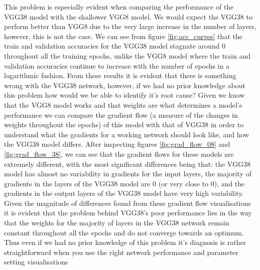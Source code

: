 {{This problem is especially evident when comparing the performance of the VGG38 model with the shallower VGG8 model. We would expect the VGG38 to perform better than VGG8 due to the very large increase in the number of layers, however, this is not the case. We can see from figure \ref{fig:acc_curves} that the train and validation accuracies for the VGG38 model stagnate around 0 throughout all the training epochs, unlike the VGG8 model where the train and validation accuracies continue to increase with the number of epochs in a logarithmic fashion. From these results it is evident that there is something wrong with the VGG38 network, however, if we had no prior knowledge about this problem how would we be able to identify it's root cause? Given we know that the VGG8 model works and that weights are what determines a model's performance we can compare the gradient flow (a measure of the changes in weights throughout the epochs) of this model with that of VGG38 in order to understand what the gradients for a working network should look like, and how the VGG38 model differs. After inspecting figures \ref{fig:grad_flow_08} and \ref{fig:grad_flow_38}, we can see that the gradient flows for these models are extremely different, with the most significant differences being that: the VGG38 model has almost no variability in gradients for the input layers, the majority of gradients in the layers of the VGG38 model are 0 (or very close to 0), and the gradients in the output layers of the VGG38 model have very high variability. Given the magnitude of differences found from these gradient flow visualisations it is evident that the problem behind VGG38's poor performance lies in the way that the weights for the majority of layers in the VGG38 network remain constant throughout all the epochs and do not converge towards an optimum. Thus even if we had no prior knowledge of this problem it's diagnosis is rather straightforward when you use the right network performance and parameter setting visualisations
}}
